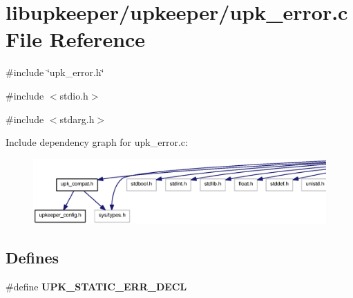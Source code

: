\section{libupkeeper/upkeeper/upk\_\-error.c File Reference}
\label{upk__error_8c}
{\ttfamily \#include \char`\"{}upk\_\-error.h\char`\"{}}\par
{\ttfamily \#include $<$stdio.h$>$}\par
{\ttfamily \#include $<$stdarg.h$>$}\par
Include dependency graph for upk\_\-error.c:\nopagebreak
\begin{figure}[H]
\begin{center}
\leavevmode
\includegraphics[width=400pt]{upk__error_8c__incl}
\end{center}
\end{figure}
\subsection*{Defines}
\begin{DoxyCompactItemize}
\item 
\#define {\bf UPK\_\-STATIC\_\-ERR\_\-DECL}
\end{DoxyCompactItemize}
